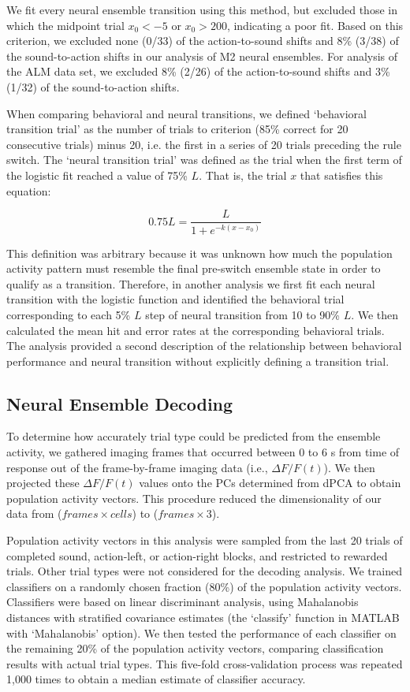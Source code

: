 We fit every neural ensemble transition using this method, but excluded those in which the midpoint trial $x_0 < -5$ or $x_0 > 200$, indicating a poor fit. Based on this criterion, we excluded none (0/33) of the action-to-sound shifts and 8\% (3/38) of the sound-to-action shifts in our analysis of M2 neural ensembles. For analysis of the ALM data set, we excluded 8\% (2/26) of the action-to-sound shifts and 3\% (1/32) of the sound-to-action shifts. 

When comparing behavioral and neural transitions, we defined `behavioral transition trial' as the number of trials to criterion (85\% correct for 20 consecutive trials) minus 20, i.e. the first in a series of 20 trials preceding the rule switch. The `neural transition trial' was defined as the trial when the first term of the logistic fit reached a value of 75\% $L$. That is, the trial $x$ that satisfies this equation:

\begin{equation*}
0.75L = \frac{L}{1+e^{-k(x-x_0)}}
\end{equation*}

This definition was arbitrary because it was unknown how much the population activity pattern must resemble the final pre-switch ensemble state in order to qualify as a transition. Therefore, in another analysis we first fit each neural transition with the logistic function and identified the behavioral trial corresponding to each 5\% $L$ step of neural transition from 10 to 90\% $L$. We then calculated the mean hit and error rates at the corresponding behavioral trials. The analysis provided a second description of the relationship between behavioral performance and neural transition without explicitly defining a transition trial.

\subsection*{Neural Ensemble Decoding}
To determine how accurately trial type could be predicted from the ensemble activity, we gathered imaging frames that occurred between 0 to 6 s from time of response out of the frame-by-frame imaging data (i.e., $\Delta F/F (t)$). We then projected these $\Delta F/F (t)$ values onto the PCs determined from dPCA to obtain population activity vectors. This procedure reduced the dimensionality of our data from ($frames \times cells$) to ($frames \times 3$). 

Population activity vectors in this analysis were sampled from the last 20 trials of completed sound, action-left, or action-right blocks, and restricted to rewarded trials. Other trial types were not considered for the decoding analysis. We trained classifiers on a randomly chosen fraction (80\%) of the population activity vectors. Classifiers were based on linear discriminant analysis, using Mahalanobis distances with stratified covariance estimates (the `classify' function in MATLAB with `Mahalanobis' option). We then tested the performance of each classifier on the remaining 20\% of the population activity vectors, comparing classification results with actual trial types. This five-fold cross-validation process was repeated 1,000 times to obtain a median estimate of classifier accuracy. 

